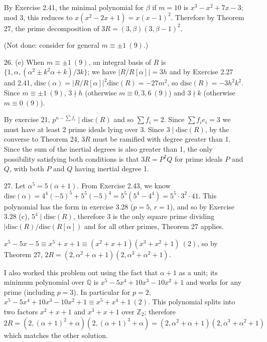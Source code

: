 \documentclass{article}
\newcommand{\Q}[0]{\mathbb{Q}}
\newcommand{\Z}[0]{\mathbb{Z}}
\newcommand{\disc}[1]{\text{disc}(#1)}
\newcommand{\modequiv}[3]{#1 \equiv #2\ (#3)}
\begin{document}
\begin{enumerate}
By Exercise 2.41, the minimal polynomial for $\beta$ if $m = 10$ is $x^3 - x^2 + 7x - 3$; mod 3, this reduces to $x(x^2 - 2x + 1) = x(x - 1)^2$.  Therefore by Theorem 27, the prime decomposition of $3R = (3, \beta)(3, \beta - 1)^2$.

(Not done: consider for general $\modequiv{m}{\pm 1}{9}$.)

\item[26. (e)] When $\modequiv{m}{\pm 1}{9}$, an integral basis of $R$ is $\{1, \alpha, (\alpha^2 \pm k^2\alpha + k)/3k\}$; we have $|R / R[\alpha]| = 3h$ and by Exercise 2.27 and 2.41, $\disc{\alpha} = |R / R[\alpha]|^2 \disc{R} = -27m^2$, so $\disc{R} = -3h^2k^2$.  Since $\modequiv{m}{\pm 1}{9}$, $3 \nmid h$ (otherwise $\modequiv{m}{0, 3, 6}{9}$) and $3 \nmid k$ (otherwise $\modequiv{m}{0}{9}$).

By exercise 21, $p^{n - \sum f_i} \mid \disc{R}$ and so $\sum f_i = 2$.  Since $\sum f_i e_i = 3$ we must have at least 2 prime ideals lying over 3.  Since $3 \mid \disc{R}$, by the converse to Theorem 24, $3R$ must be ramified with degree greater than 1.  Since the sum of the inertial degrees is also greater than 1, the only possibility satisfying both conditions is that $3R = P^2 Q$ for prime ideals $P$ and $Q$, with both $P$ and $Q$ having inertial degree 1.

\item[27.] Let $\alpha^5 = 5(\alpha + 1)$.  From Exercise 2.43, we know $\disc{\alpha} = 4^4 (-5)^5 + 5^5 (-5)^4 = 5^5 (5^4 - 4^4) = 5^5 \cdot 3^2 \cdot 41$.  This polynomial has the form in exercise 3.28 ($p = 5$, $r = 1$), and so by Exercise 3.28 (c), $5^4 \mid \disc{R}$, therefore 3 is the only square prime dividing $|\disc{R} / \disc{R[\alpha]}$ and for all other primes, Theorem 27 applies.

$x^5 - 5x - 5 \equiv x^5 + x + 1 \equiv (x^2 + x + 1)(x^3 + x^2 + 1)\ (2)$, so by Theorem 27, $2R = (2, \alpha^2 + \alpha + 1)(2, \alpha^3 + \alpha^2 + 1)$.

I also worked this problem out using the fact that $\alpha + 1$ as a unit; its minimum polynomial over $\Q$ is $x^5 - 5x^4 + 10x^3 - 10x^2 + 1$ and works for any prime (including $p = 3$).  In particular for $p = 2$, $x^5 - 5x^4 + 10x^3 - 10x^2 + 1 \equiv x^5 + x^4 + 1\ (2)$.  This polynomial splits into two factors $x^2 + x + 1$ and $x^3 + x + 1$ over $\Z_{2}$; therefore $2R = (2, (\alpha + 1)^2 + \alpha)(2, (\alpha + 1)^3 + \alpha) = (2, \alpha^2 + \alpha + 1)(2, \alpha^3 + \alpha^2 + 1)$ which matches the other solution.


\end{enumerate}
\end{document}

